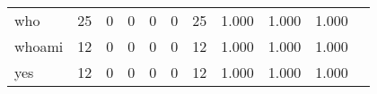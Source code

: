 \begin{longtable}{lp{1.20cm}p{1.20cm}p{1.20cm}p{1.20cm}p{1.20cm}p{1.20cm}p{1.20cm}p{1.20cm}p{1.20cm}p{1.20cm}}
who       &                                    25 &                                                  0 &                                                  0 &                                                  0 &                                                  0 &                                                 25 &                                         1.000 &                                              1.000 &                                              1.000 \\
whoami    &                                    12 &                                                  0 &                                                  0 &                                                  0 &                                                  0 &                                                 12 &                                         1.000 &                                              1.000 &                                              1.000 \\
yes       &                                    12 &                                                  0 &                                                  0 &                                                  0 &                                                  0 &                                                 12 &                                         1.000 &                                              1.000 &                                              1.000 \\
\end{longtable}

